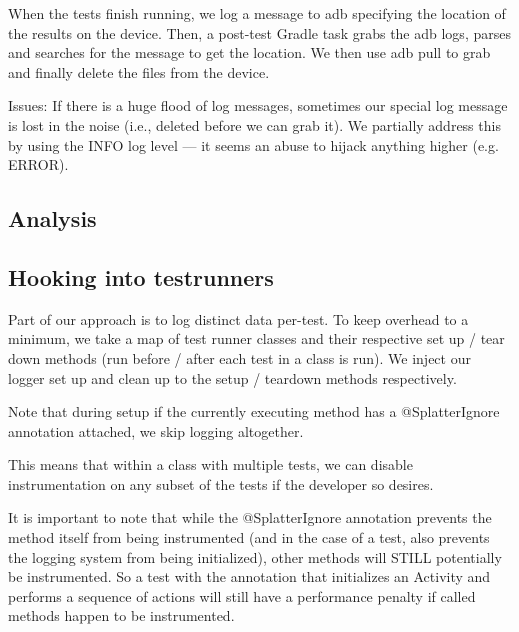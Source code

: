 When the tests finish running, we log a message to adb specifying the location of the results on the device. Then, a post-test Gradle task grabs the adb logs, parses and searches for the message to get the location. We then use adb pull to grab and finally delete the files from the device.

Issues:
If there is a huge flood of log messages, sometimes our special log message is lost in the noise (i.e., deleted before we can grab it). We partially address this by using the INFO log level --- it seems an abuse to hijack anything higher (e.g. ERROR).

\subsection{Analysis}


\subsection{Hooking into testrunners}

Part of our approach is to log distinct data per-test. To keep overhead to a minimum, we take a map of test runner classes and their respective set up / tear down methods (run before / after each test in a class is run). We inject our logger set up and clean up to the setup / teardown methods respectively.

Note that during setup if the currently executing method has a @SplatterIgnore annotation attached, we skip logging altogether.

This means that within a class with multiple tests, we can disable instrumentation on any subset of the tests if the developer so desires.

It is important to note that while the @SplatterIgnore annotation prevents the method itself from being instrumented (and in the case of a test, also prevents the logging system from being initialized), other methods will STILL potentially be instrumented. So a test with the annotation that initializes an Activity and performs a sequence of actions will still have a performance penalty if called methods happen to be instrumented.

